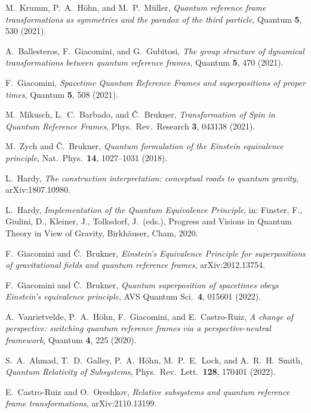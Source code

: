 \documentclass[aps,10pt,twocolumn,showpacs,pra,citeautoscript,amsmath,amssymb,floatfix,superscriptaddress]{revtex4-1}
\begin{document}
\begin{thebibliography}{47}
M.\ Krumm, P.\ A.\ H\"ohn, and M.\ P.\ M\"uller, \emph{Quantum reference frame transformations as symmetries and the paradox of the third particle}, Quantum \textbf{5}, 530 (2021).

A.\ Ballesteros, F.\ Giacomini, and G.\ Gubitosi, \emph{The group structure of dynamical transformations between quantum reference frames}, Quantum \textbf{5}, 470 (2021).

F.\ Giacomini, \emph{Spacetime Quantum Reference Frames and superpositions of proper times}, Quantum \textbf{5}, 508 (2021).

M.\ Mikusch, L.\ C.\ Barbado, and \v{C}.\ Brukner, \emph{Transformation of Spin in Quantum Reference Frames}, Phys.\ Rev.\ Research \textbf{3}, 043138 (2021).

M.\ Zych and \v{C}.\ Brukner, \emph{Quantum formulation of the Einstein equivalence principle}, Nat.\ Phys.\ \textbf{14}, 1027--1031 (2018).

L.\ Hardy, \emph{The construction interpretation: conceptual roads to quantum gravity}, arXiv:1807.10980.

L.\ Hardy, \emph{Implementation of the Quantum Equivalence Principle}, in: Finster, F., Giulini, D., Kleiner, J., Tolksdorf, J.\ (eds.), Progress and Visions in Quantum Theory in View of Gravity, Birkh\"auser, Cham, 2020.

F.\ Giacomini and \v{C}.\ Brukner, \emph{Einstein's Equivalence Principle for superpositions of gravitational fields and quantum reference frames}, arXiv:2012.13754.

F.\ Giacomini and \v{C}.\ Brukner, \emph{Quantum superposition of spacetimes obeys Einstein's equivalence principle}, AVS Quantum Sci.\ \textbf{4}, 015601 (2022).

A.\ Vanrietvelde, P.\ A.\ H\"ohn, F.\ Giacomini, and E.\ Castro-Ruiz, \emph{A change of perspective: switching quantum reference frames via a perspective-neutral framework}, Quantum \textbf{4}, 225 (2020).

S.\ A.\ Ahmad, T.\ D.\ Galley, P.\ A.\ H\"ohn, M.\ P.\ E.\ Lock, and A.\ R.\ H.\ Smith, \emph{Quantum Relativity of Subsystems}, Phys.\ Rev.\ Lett.\ \textbf{128}, 170401 (2022).

E.\ Castro-Ruiz and O.\ Oreshkov, \emph{Relative subsystems and quantum reference frame transformations}, arXiv:2110.13199.


\end{thebibliography}
\end{document}

